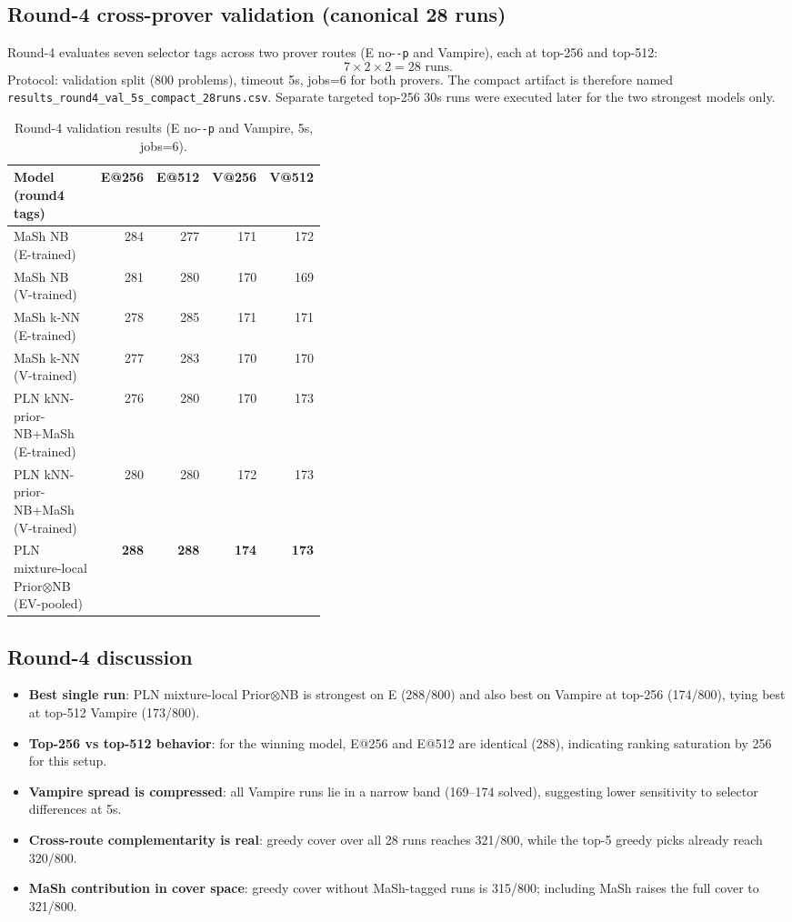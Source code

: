 \documentclass[11pt]{article}
\newcommand{\lpath}[1]{\texttt{\nolinkurl{#1}}}
\begin{document}
\subsection{Round-4 cross-prover validation (canonical 28 runs)}
Round-4 evaluates seven selector tags across two prover routes (E no-\texttt{-p}
and Vampire), each at top-256 and top-512:
\[
  7 \times 2 \times 2 = 28 \text{ runs}.
\]
Protocol: validation split (800 problems), timeout 5s, jobs=6 for both provers.
The compact artifact is therefore named
\lpath{results_round4_val_5s_compact_28runs.csv}. Separate targeted
top-256 30s runs were executed later for the two strongest models only.

\begin{table}[h]
\centering
\begin{small}
\begin{tabular}{p{0.40\linewidth}rrrr}
\hline
Model (round4 tags) & E@256 & E@512 & V@256 & V@512 \\
\hline
MaSh NB (E-trained) & 284 & 277 & 171 & 172 \\
MaSh NB (V-trained) & 281 & 280 & 170 & 169 \\
MaSh k-NN (E-trained) & 278 & 285 & 171 & 171 \\
MaSh k-NN (V-trained) & 277 & 283 & 170 & 170 \\
PLN kNN-prior-NB+MaSh (E-trained) & 276 & 280 & 170 & 173 \\
PLN kNN-prior-NB+MaSh (V-trained) & 280 & 280 & 172 & 173 \\
PLN mixture-local Prior$\otimes$NB (EV-pooled) & \textbf{288} & \textbf{288} & \textbf{174} & \textbf{173} \\
\hline
\end{tabular}
\end{small}
\caption{Round-4 validation results (E no-\texttt{-p} and Vampire, 5s, jobs=6).}
\label{tab:r4val}
\end{table}

\subsection{Round-4 discussion}
\begin{itemize}
\item \textbf{Best single run}: PLN mixture-local Prior$\otimes$NB is strongest on E
      (288/800) and also best on Vampire at top-256 (174/800), tying best at
      top-512 Vampire (173/800).
\item \textbf{Top-256 vs top-512 behavior}: for the winning model, E@256 and E@512
      are identical (288), indicating ranking saturation by 256 for this setup.
\item \textbf{Vampire spread is compressed}: all Vampire runs lie in a narrow band
      (169--174 solved), suggesting lower sensitivity to selector differences at 5s.
\item \textbf{Cross-route complementarity is real}: greedy cover over all 28 runs
      reaches 321/800, while the top-5 greedy picks already reach 320/800.
\item \textbf{MaSh contribution in cover space}: greedy cover without MaSh-tagged
      runs is 315/800; including MaSh raises the full cover to 321/800.
\end{itemize}
\end{document}
